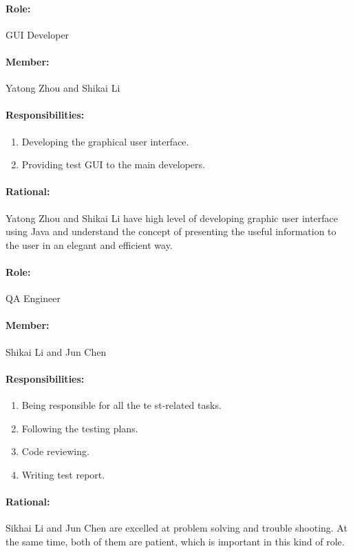 \documentclass[11pt, a4paper]{report}
\begin{document}
\paragraph{Role: } GUI Developer
\paragraph{Member: } Yatong Zhou and Shikai Li
\paragraph{Responsibilities: }
\begin{enumerate}
	\item  Developing the graphical user interface.
	\item  Providing test GUI to the main developers.
\end{enumerate}
\paragraph{Rational: \\}
Yatong Zhou and Shikai Li have high level of developing graphic user interface using Java and understand the concept of presenting the useful information to the user in an elegant and efficient way.

\paragraph{Role: } QA Engineer
\paragraph{Member: } Shikai Li and Jun Chen
\paragraph{Responsibilities: }
\begin{enumerate}
	\item  Being responsible for all the te st-related tasks.
	\item  Following the testing plans.
	\item  Code reviewing.
	\item  Writing test report.
\end{enumerate}
\paragraph{Rational: \\}
Sikhai Li and Jun Chen are excelled at problem solving and trouble shooting. 
At the same time, both of them are patient, which is important in this kind of role.
\end{document}
